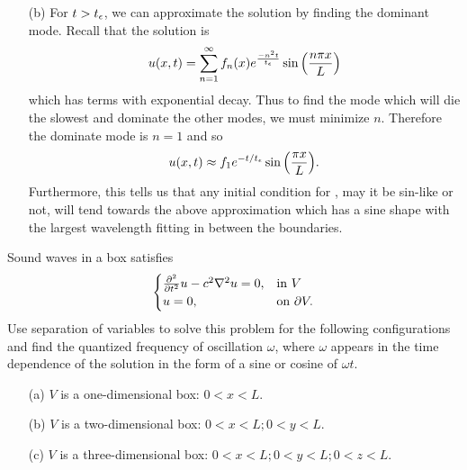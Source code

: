 \documentclass[12pt]{report}
\begin{document}
\begin{solution}
\begin{enumerate}
        \item [(b)]
        For $t > t_{\epsilon}$, we can approximate the solution by finding the dominant mode. Recall that the solution is
        \[
            u(x,t) = \sum_{n=1}^{\infty} f_n(x) e^{\frac{-n^2 t}{t_{\epsilon}}} \sin{\left(\frac{n \pi x}{L}\right)}
        \] 
        which has terms with exponential decay. Thus to find the mode which will die the slowest and dominate the other modes, we must minimize $n$. Therefore the dominate mode is $n=1$ and so
        \[
            u(x,t) \approx f_1 e^{-t/t_{\epsilon}}\sin{\left(\frac{\pi x}{L}\right)}.
        \]
        Furthermore, this tells us that any initial condition for , may it be sin-like or not, will tend towards the above approximation which has a sine shape with the largest wavelength fitting in between the boundaries. 


    \end{enumerate}
\end{solution}

\newpage



\begin{problem}
    Sound waves in a box satisfies
    \[
        \begin{cases}
            \frac{\partial^{2} }{\partial t^{2}}u - c^2\nabla^2u = 0, &\text{in} ~ V\\
            u = 0, &\text{on} ~ \partial V.
        \end{cases}
    \] 
    Use separation of variables to solve this problem for the following configurations and find the quantized frequency of oscillation $\omega$, where $\omega$ appears in the time dependence of the solution in the form of a sine or cosine of $\omega t$.
    \begin{enumerate}
        \item [(a)] $V$ is a one-dimensional box: $0<x<L$.
        \item [(b)] $V$ is a two-dimensional box: $0<x<L; 0<y<L$.
        \item [(c)] $V$ is a three-dimensional box: $0<x<L; 0<y<L; 0<z<L$.
    \end{enumerate}
\end{problem}
\end{document}
